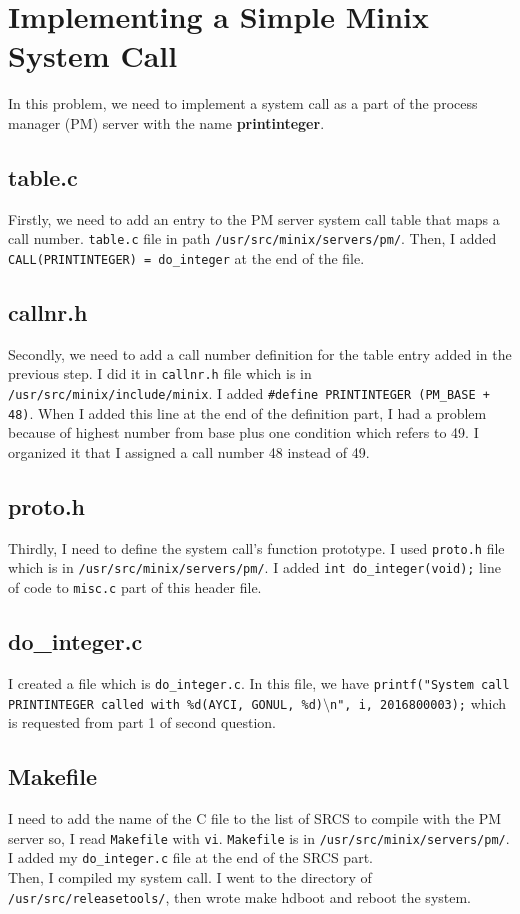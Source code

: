 \documentclass[paper=a4, fontsize=11pt]{scrartcl}
\numberwithin{equation}{section}		%
\numberwithin{figure}{section}			%
\numberwithin{table}{section}				%
\begin{document}
\section{Implementing  a Simple Minix System Call}
In this problem, we need to implement a system call as a part of the process manager (PM) server with the name \textbf{printinteger}. 
\subsection{table.c}
Firstly, we need to add an entry to the PM server system call table that maps a call number. \texttt{table.c} file in path \texttt{/usr/src/minix/servers/pm/}. Then, I added \texttt{CALL(PRINTINTEGER) = do\_integer} at the end of the file.

\subsection{callnr.h}
Secondly, we need to add a call number definition for the table entry added in the previous step. I did it in \texttt{callnr.h} file which is in \texttt{/usr/src/minix/include/minix}. I added \texttt{\#define PRINTINTEGER        (PM\_BASE + 48)}. When I added this line at the end of the definition part, I had a problem because of highest number from base plus one condition which refers to 49. I organized it that I assigned a call number 48 instead of 49.

\subsection{proto.h}
Thirdly, I need to define the system call's function prototype. I used \texttt{proto.h} file which is in \texttt{/usr/src/minix/servers/pm/}. I added \texttt{int do\_integer(void);} line of code to \texttt{misc.c} part of this header file.

\subsection{do\_integer.c}
I created a file which is \texttt{do\_integer.c}. In this file, we have \texttt{printf("System call PRINTINTEGER called with \%d(AYCI, GONUL, \%d)$\setminus$n", i, 2016800003);} which is requested from part 1 of second question.

\subsection{Makefile}
I need to add the name of the C file to the list of SRCS to compile with the PM server so, I read \texttt{Makefile} with \texttt{vi}. \texttt{Makefile} is in \texttt{/usr/src/minix/servers/pm/}. I added my \texttt{do\_integer.c} file at the end of the SRCS part.
\\
Then, I compiled my system call. I went to the directory of \texttt{/usr/src/releasetools/}, then wrote make hdboot and reboot the system.
 
\end{document}
